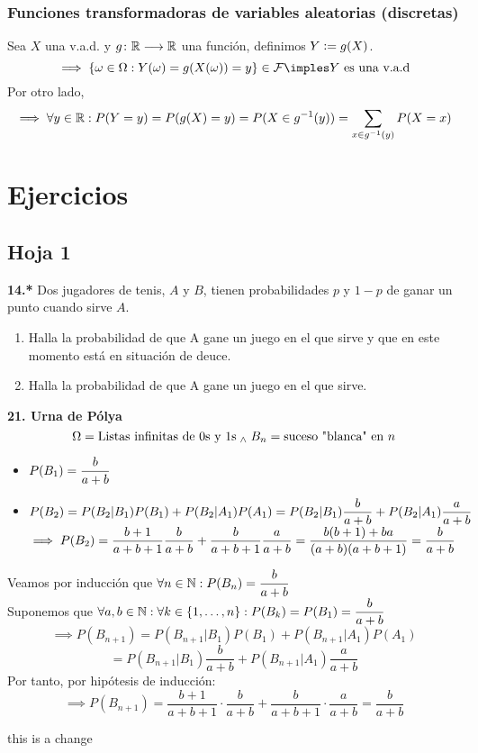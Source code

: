 \subsubsection{Funciones transformadoras de variables aleatorias (discretas)}
Sea $X$ una v.a.d. y $g \colon \mathbb{R} \longrightarrow \mathbb{R}$ una función, definimos $Y\vcentcolon= g(X)$.
\[\implies \{\omega \in\Omega:Y(\omega)=g(X(\omega))=y\} \in \F \imples Y\tex{ es una v.a.d}\]
Por otro lado, 
\[\implies \forall y \in \mathbb{R}:P(Y=y)=P(g(X)=y)=P(X\in g^{-1}(y))=\sum_{x\in g^{-1}(y)}P(X=x)\]


\section{Ejercicios}
\subsection{Hoja 1}

\noindent \textbf{14.*} Dos jugadores de tenis, $A$ y $B$, tienen probabilidades $p$ y $1-p$ de ganar un punto cuando sirve $A$.
\begin{enumerate}
    \item Halla la probabilidad de que A gane un juego en el que sirve y que en este momento está en situación de deuce.
    \item Halla la probabilidad de que A gane un juego en el que sirve.
\end{enumerate}

\noindent \textbf{21. Urna de Pólya}
\[\Omega= \text{Listas infinitas de $0$s y $1$s} \; _{\wedge} \; B_n=\text{suceso "blanca" en }n\]
\begin{itemize}%
    \item $\displaystyle P(B_1)=\frac{b}{a+b}$
    \item $\displaystyle P(B_2)=P(B_2|B_1)P(B_1)+P(B_2|A_1)P(A_1)=P(B_2|B_1)\frac{b}{a+b}+P(B_2|A_1)\frac{a}{a+b}$ \\
    $\displaystyle \implies P(B_2)=\frac{b+1}{a+b+1}\frac{b}{a+b}+\frac{b}{a+b+1}\frac{a}{a+b}=\frac{b(b+1)+ba}{(a+b)(a+b+1)}=\frac{b}{a+b}$
\end{itemize}
\begin{dem}
    Veamos por inducción que $\displaystyle \forall n \in \mathbb{N} :P(B_n)=\frac{b}{a+b}$ \\
    Suponemos que $\displaystyle \forall a,b \in \mathbb{N}: \forall k \in \{1, \dots, n\}:P(B_k)=P(B_1)=\frac{b}{a+b}$
    \[\implies P(B_{n+1})=P(B_{n+1}|B_1)P(B_1)+P(B_{n+1}|A_1)P(A_1)\]
    \[=P(B_{n+1}|B_1)\frac{b}{a+b}+P(B_{n+1}|A_1)\frac{a}{a+b}\]
    Por tanto, por hipótesis de inducción:
    \[\implies P(B_{n+1})=\frac{b+1}{a+b+1}\cdot\frac{b}{a+b} + \frac{b}{a+b+1}\cdot\frac{a}{a+b}=\frac{b}{a+b}\]
\end{dem}

this is a change




